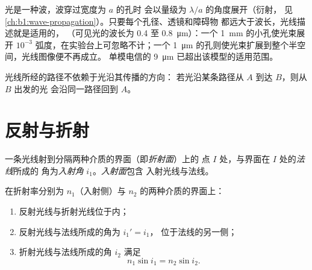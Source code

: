 \begin{remark}[模型的局限]\label{rem:b1:rays-reflection-refraction:limits}
光是一种波，波穿过宽度为 $a$ 的孔时
会以量级为 $\lambda/a$ 的角度展开（衍射，
见\cref{ch:b1:wave-propagation}）。只要每个孔径、透镜和障碍物
都远大于波长，光线描述就是适用的，
（可见光的波长为 \qty{0.4}{} 至 \qty{0.8}{\micro m}）：一个 \qty{1}{mm}
的小孔使光束展开 $10^{-3}$ 弧度，在实验台上可忽略不计；一个
\qty{1}{\micro m} 的孔则使光束扩展到整个半空间，光线图像便不再成立。
单模电信的 \qty{9}{\micro m} 
已超出该模型的适用范围。
\end{remark}

\begin{proposition}[光路可逆]\label{prop:b1:rays-reflection-refraction:reversibility}
光线所经的路径不依赖于光沿其传播的方向：
若光沿某条路径从 $A$ 到达 $B$，则从 $B$ 出发的光
会沿同一路径回到 $A$。
\end{proposition}
\admitted

\section{反射与折射}

\begin{definition}[入射]\label{def:b1:rays-reflection-refraction:incidence}
一条光线射到分隔两种介质的界面（即\emph{折射面}）上的
点 $I$ 处，与界面在 $I$ 处的\emph{法线}所成的
角为\emph{入射角} $i_1$。\emph{入射面}包含
入射光线与法线。
\end{definition}

\begin{theorem}\label{thm:b1:rays-reflection-refraction:snell}
在折射率分别为 $n_1$（入射侧）与
$n_2$ 的两种介质的界面上：
\begin{enumerate}
  \item 反射光线与折射光线位于内；
  \item 反射光线与法线所成的角为 $i_1' = i_1$，
        位于法线的另一侧；
  \item 折射光线与法线所成的角 $i_2$ 满足
        \[
        n_1 \sin i_1 = n_2 \sin i_2 .
        \]
\end{enumerate}
\end{theorem}
\admitted

